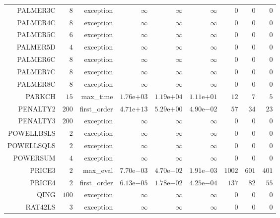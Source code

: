 \begin{longtable}{rrrrrrrrr}
PALMER3C & \(     8\) & exception & \(\infty\) & \(\infty\) & \(\infty\) & \(     0\) & \(     0\) & \(     0\) \\
PALMER4C & \(     8\) & exception & \(\infty\) & \(\infty\) & \(\infty\) & \(     0\) & \(     0\) & \(     0\) \\
PALMER5C & \(     6\) & exception & \(\infty\) & \(\infty\) & \(\infty\) & \(     0\) & \(     0\) & \(     0\) \\
PALMER5D & \(     4\) & exception & \(\infty\) & \(\infty\) & \(\infty\) & \(     0\) & \(     0\) & \(     0\) \\
PALMER6C & \(     8\) & exception & \(\infty\) & \(\infty\) & \(\infty\) & \(     0\) & \(     0\) & \(     0\) \\
PALMER7C & \(     8\) & exception & \(\infty\) & \(\infty\) & \(\infty\) & \(     0\) & \(     0\) & \(     0\) \\
PALMER8C & \(     8\) & exception & \(\infty\) & \(\infty\) & \(\infty\) & \(     0\) & \(     0\) & \(     0\) \\
PARKCH & \(    15\) & max\_time & \( 1.76\)e\(+03\) & \( 1.19\)e\(+04\) & \( 1.11\)e\(+01\) & \(    12\) & \(     7\) & \(     5\) \\
PENALTY2 & \(   200\) & first\_order & \( 4.71\)e\(+13\) & \( 5.29\)e\(+00\) & \( 4.90\)e\(-02\) & \(    57\) & \(    34\) & \(    23\) \\
PENALTY3 & \(   200\) & exception & \(\infty\) & \(\infty\) & \(\infty\) & \(     0\) & \(     0\) & \(     0\) \\
POWELLBSLS & \(     2\) & exception & \(\infty\) & \(\infty\) & \(\infty\) & \(     0\) & \(     0\) & \(     0\) \\
POWELLSQLS & \(     2\) & exception & \(\infty\) & \(\infty\) & \(\infty\) & \(     0\) & \(     0\) & \(     0\) \\
POWERSUM & \(     4\) & exception & \(\infty\) & \(\infty\) & \(\infty\) & \(     0\) & \(     0\) & \(     0\) \\
PRICE3 & \(     2\) & max\_eval & \( 7.70\)e\(-03\) & \( 4.70\)e\(-02\) & \( 1.91\)e\(-03\) & \(  1002\) & \(   601\) & \(   401\) \\
PRICE4 & \(     2\) & first\_order & \( 6.13\)e\(-05\) & \( 1.78\)e\(-02\) & \( 4.25\)e\(-04\) & \(   137\) & \(    82\) & \(    55\) \\
QING & \(   100\) & exception & \(\infty\) & \(\infty\) & \(\infty\) & \(     0\) & \(     0\) & \(     0\) \\
RAT42LS & \(     3\) & exception & \(\infty\) & \(\infty\) & \(\infty\) & \(     0\) & \(     0\) & \(     0\) \\

\end{longtable}
